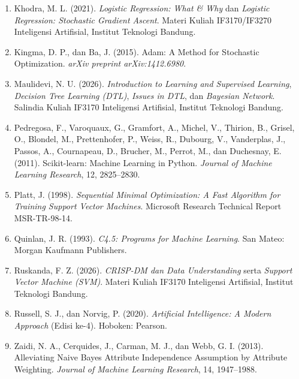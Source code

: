 \begin{enumerate}
  \item Khodra, M. L. (2021). \textit{Logistic Regression: What \& Why} dan \textit{Logistic Regression: Stochastic Gradient Ascent}. Materi Kuliah IF3170/IF3270 Inteligensi Artifisial, Institut Teknologi Bandung.
  \item Kingma, D. P., dan Ba, J. (2015). Adam: A Method for Stochastic Optimization. \textit{arXiv preprint arXiv:1412.6980}.
  \item Maulidevi, N. U. (2026). \textit{Introduction to Learning and Supervised Learning}, \textit{Decision Tree Learning (DTL)}, \textit{Issues in DTL}, dan \textit{Bayesian Network}. Salindia Kuliah IF3170 Inteligensi Artifisial, Institut Teknologi Bandung.
  \item Pedregosa, F., Varoquaux, G., Gramfort, A., Michel, V., Thirion, B., Grisel, O., Blondel, M., Prettenhofer, P., Weiss, R., Dubourg, V., Vanderplas, J., Passos, A., Cournapeau, D., Brucher, M., Perrot, M., dan Duchesnay, E. (2011). Scikit-learn: Machine Learning in Python. \textit{Journal of Machine Learning Research}, 12, 2825--2830.
  \item Platt, J. (1998). \textit{Sequential Minimal Optimization: A Fast Algorithm for Training Support Vector Machines}. Microsoft Research Technical Report MSR-TR-98-14.
  \item Quinlan, J. R. (1993). \textit{C4.5: Programs for Machine Learning}. San Mateo: Morgan Kaufmann Publishers.
  \item Ruskanda, F. Z. (2026). \textit{CRISP-DM dan Data Understanding} serta \textit{Support Vector Machine (SVM)}. Materi Kuliah IF3170 Inteligensi Artifisial, Institut Teknologi Bandung.
  \item Russell, S. J., dan Norvig, P. (2020). \textit{Artificial Intelligence: A Modern Approach} (Edisi ke-4). Hoboken: Pearson.
  \item Zaidi, N. A., Cerquides, J., Carman, M. J., dan Webb, G. I. (2013). Alleviating Naive Bayes Attribute Independence Assumption by Attribute Weighting. \textit{Journal of Machine Learning Research}, 14, 1947--1988.
\end{enumerate}

